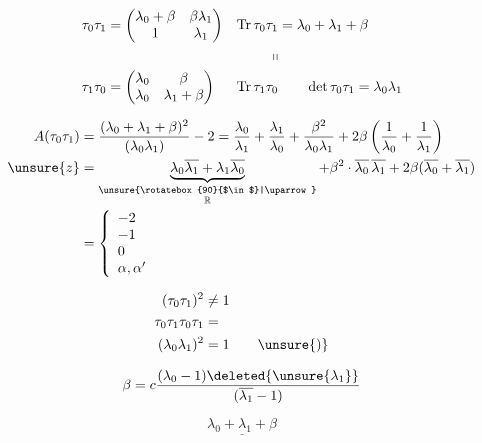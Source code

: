 
\[
\begin{aligned}
\tau_0\tau_1&=\begin{pmatrix}\lambda_0+\beta&\beta\lambda_1\\1&\lambda_1\end{pmatrix}
&\operatorname{Tr}\tau_0\tau_1&=\lambda_0+\lambda_1+\beta\\
&&\ \shortparallel&\\
\tau_1\tau_0&=\begin{pmatrix}\lambda_0&\beta\\\lambda_0&\lambda_1+\beta\end{pmatrix}
&\operatorname{Tr}\tau_1\tau_0&\qquad\det\tau_0\tau_1=\lambda_0\lambda_1
\end{aligned}
\]

\[
\begin{aligned}
A(\tau_0\tau_1)
&=\frac{(\lambda_0+\lambda_1+\beta)^2}{(\lambda_0\lambda_1)}-2
=\frac{\lambda_0}{\lambda_1}+\frac{\lambda_1}{\lambda_0}+
\frac{\beta^2}{\lambda_0\lambda_1}+2\beta\left(\frac1{\lambda_0}+\frac1{\lambda_1}\right)\\
\unsure{z}&=\underbrace{\lambda_0\overline{\lambda_1}+\lambda_1\overline{\lambda_0}}_{\substack{\unsure{\rotatebox{90}{$\in$}|\uparrow}\\\mathbb R}}
+\beta^2\cdot\overline{\lambda_0}\,\overline{\lambda_1}
+2\beta(\overline{\lambda_0}+\overline{\lambda_1})\\
&=\left\{\begin{array}{l}-2\\-1\\0\\\alpha,\alpha'\end{array}\right.
\end{aligned}
\]

\[
\begin{aligned}
(\tau_0\tau_1)^2&\ne 1\\
\tau_0\tau_1\tau_0\tau_1&=\\
(\lambda_0\lambda_1)^2&=1\qquad\unsure{)}
\end{aligned}
\]

\[
\beta=c\frac{(\lambda_0-1)\deleted{\unsure{\lambda_1}}}{(\overline{\lambda_1}-1)}
\]

\[
\underline{\lambda_0+\lambda_1+\beta}
\]

